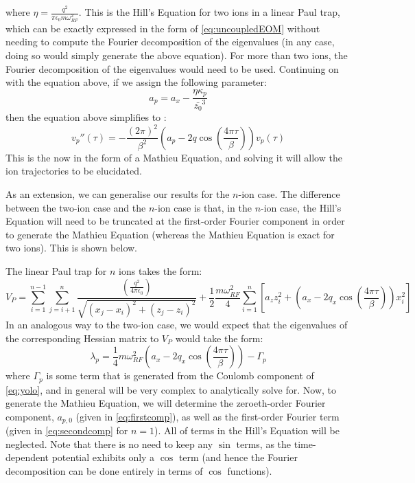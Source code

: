 \documentclass{article}
\begin{document}
where $\eta = \frac{q^2}{\pi \epsilon_0  m \omega_{RF}^2}$. This is the Hill's Equation for two ions in a linear Paul trap, which can be exactly expressed in the form of \eqref{eq:uncoupledEOM} without needing to compute the Fourier decomposition of the eigenvalues (in any case, doing so would simply generate the above equation). For more than two ions, the Fourier decomposition of the eigenvalues would need to be used. Continuing on with the equation above, if we assign the following parameter:
\begin{equation}
a_p = a_x - \frac{\eta \kappa_p}{\bar{z_0}^3}	
\end{equation}
then the equation above simplifies to :
\begin{equation}
v_p '' (\tau) = - \frac{(2 \pi)^2}{\beta^2} \left( a_p - 2 q \cos \left( \frac{4 \pi \tau}{\beta} \right) \right)	 v_p (\tau)
\end{equation}
This is the now in the form of a Mathieu Equation, and solving it will allow the ion trajectories to be elucidated. \par
\medskip
\noindent As an extension, we can generalise our results for the $n$-ion case. The difference between the two-ion case and the $n$-ion case is that, in the $n$-ion case, the Hill's Equation will need to be truncated at the first-order Fourier component in order to generate the Mathieu Equation (whereas the Mathieu Equation is exact for two ions). This is shown below. \par
\medskip
\noindent The linear Paul trap for $n$ ions takes the form:
\begin{equation}
	V_P = \sum_{i = 1}^{n - 1} \sum_{j = i + 1}^{n} \frac{\left( \frac{q^2}{4 \pi \epsilon_0} \right)}{\sqrt{(x_j - x_i)^2 + (z_j - z_i)^2}}  + \frac{1}{2} \frac{m \omega_{RF}^2}{4} \sum_{i = 1}^n [ a_z z_i^2 + (a_x - 2 q_x \cos(\frac{4 \pi \tau}{\beta}) ) x_i^2 ]
	\label{eq:yolo}
\end{equation}
In an analogous way to the two-ion case, we would expect that the eigenvalues of the corresponding Hessian matrix to $V_P$ would take the form:
\begin{equation}
	\lambda_p = \frac{1}{4} m \omega_{RF}^2 \left(a_x - 2 q_x \cos(\frac{4 \pi \tau}{\beta}) \right) - \Gamma_p
\end{equation}
where $\Gamma_p$ is some term that is generated from the Coulomb component of \eqref{eq:yolo}, and in general will be very complex to analytically solve for. Now, to generate the Mathieu Equation, we will determine the zeroeth-order Fourier component, $a_{p,0}$ (given in \eqref{eq:firstcomp}), as well as the first-order Fourier term (given in \eqref{eq:secondcomp} for $n = 1$). All of terms in the Hill's Equation will be neglected. Note that there is no need to keep any $\sin$ terms, as the time-dependent potential exhibits only a $\cos$ term (and hence the Fourier decomposition can be done entirely in terms of $\cos$ functions).\par
\end{document}

